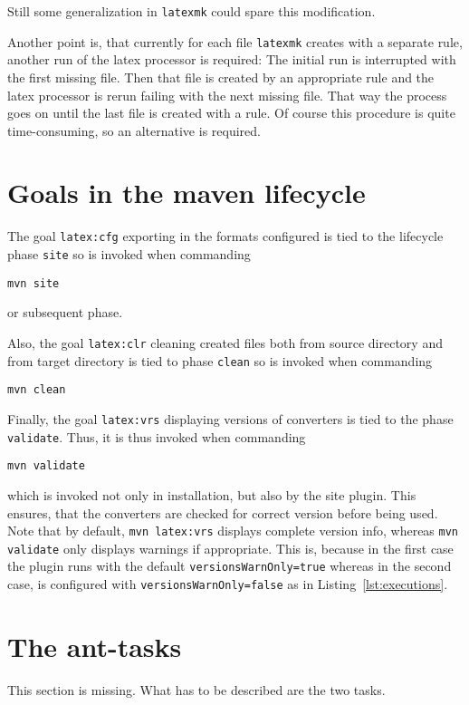 Still some generalization in \texttt{latexmk} could spare this modification. 

Another point is, that currently for each file \texttt{latexmk} creates with a separate rule, 
another run of the latex processor is required: 
The initial run is interrupted with the first missing file. 
Then that file is created by an appropriate rule and the latex processor is rerun 
failing with the next missing file. 
That way the process goes on until the last file is created with a rule. 
Of course this procedure is quite time-consuming, so an alternative is required. 





\section{Goals in the maven lifecycle}\label{sec:usageLifecycle}

The goal \texttt{latex:cfg} exporting in the formats configured
is tied to the lifecycle phase \texttt{site} so is invoked
when commanding
%
\begin{Verbatim}[fontsize=\scriptsize]
mvn site
\end{Verbatim}
%
or subsequent phase.

Also, the goal \texttt{latex:clr} cleaning created files
both from source directory and from target directory
is tied to phase \texttt{clean} so is invoked
when commanding
%
\begin{Verbatim}[fontsize=\scriptsize]
mvn clean
\end{Verbatim}

Finally, the goal \texttt{latex:vrs} displaying versions of converters
is tied to the phase \texttt{validate}. 
Thus, it is thus invoked when commanding
%
\begin{Verbatim}[fontsize=\scriptsize]
mvn validate
\end{Verbatim}
%
which is invoked not only in installation, but also by the site plugin.
This ensures, that the converters are checked for correct version
before being used. 
Note that by default, \texttt{mvn latex:vrs} displays complete version info,
whereas \texttt{mvn validate} only displays warnings if appropriate. 
This is, because in the first case the plugin runs with the default \texttt{versionsWarnOnly=true} 
whereas in the second case, is configured with \texttt{versionsWarnOnly=false} 
as in Listing~\ref{lst:executions}. 




\section{The ant-tasks}\label{sec:usageAntTask}

This section is missing.
What has to be described are the two tasks. 
